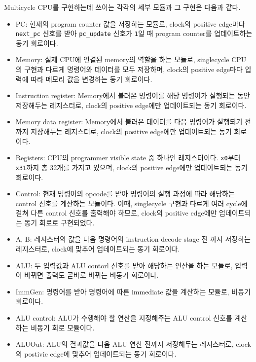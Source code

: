 \documentclass[openright, a4paper]{article}
\newcommand{\code}[1]{\texttt{#1}}
\begin{document}
Multicycle CPU를 구현하는데 쓰이는 각각의 세부 모듈과 그 구현은 다음과 같다.

\hfill

\begin{itemize}
    \item PC: 현재의 program counter 값을 저장하는 모듈로, clock의 positive 
    edge마다 \code{next_pc} 신호를 받아 \code{pc_update} 신호가 \code{1}일 때 
    program counter를 업데이트하는 동기 회로이다.

    \item Memory: 실제 CPU에 연결된 memory의 역할을 하는 모듈로, singlecycle 
    CPU의 구현과 다르게 명령어와 데이터를 모두 저장하며, clock의 positive 
    edge마다 입력에 따라 메모리 값을 변경하는 동기 회로이다.

    \item Instruction register: Memory에서 불러온 명령어를 해당 명령어가 
    실행되는 동안 저장해두는 레지스터로, clock의 positive edge에만 업데이트되는 
    동기 회로이다.

    \item Memory data register: Memory에서 불러온 데이터를 다음 명령어가 
    실행되기 전까지 저장해두는 레지스터로, clock의 positive edge에만 
    업데이트되는 동기 회로이다.

    \item Registers: CPU의 programmer visible state 중 하나인 레지스터이다. 
    \code{x0}부터 \code{x31}까지 총 32개를 가지고 있으며, clock의 positive 
    edge에만 업데이트되는 동기 회로이다.

    \item Control: 현재 명령어의 opcode를 받아 명령어의 실행 과정에 따라 
    해당하는 control 신호를 계산하는 모듈이다. 이때, singlecycle 구현과 다르게 
    여러 cycle에 걸쳐 다른 control 신호를 출력해야 하므로, clock의 positive 
    edge에만 업데이트되는 동기 회로로 구현되었다.

    \item A, B: 레지스터의 값을 다음 명령어의 instruction decode stage 전 까지 
    저장하는 레지스터로, clock에 맞추어 업데이트되는 동기 회로이다.

    \item ALU: 두 입력값과 ALU contorl 신호를 받아 해당하는 연산을 하는 
    모듈로, 입력이 바뀌면 출력도 곧바로 바뀌는 비동기 회로이다.

    \item ImmGen: 명령어를 받아 명령어에 따른 immediate 값을 계산하는 모듈로, 
    비동기 회로이다.

    \item ALU control: ALU가 수행해야 할 연산을 지정해주는 ALU control 신호를 
    계산하는 비동기 회로 모듈이다.

    \item ALUOut: ALU의 결과값을 다음 ALU 연산 전까지 저장해두는 레지스터로, 
    clock의 postivie edge에 맞추어 업데이트되는 동기 회로이다.
\end{itemize}
\end{document}
